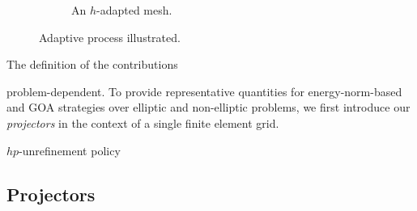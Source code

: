 \begin{figure}
\begin{subfigure}[b]{0.3\textwidth}
\begin{tikzpicture}[x=0.5cm,y=0.5cm]
    \end{tikzpicture}
    \caption{An $h$-adapted mesh.}
    \label{fig:adaptedmesh}
  \end{subfigure}
  \caption{Adaptive process illustrated.}
  \label{fig:unrefinement}
\end{figure}

The definition of the contributions { problem-dependent. To provide representative quantities for energy-norm-based and GOA strategies over elliptic and non-elliptic problems, we first introduce our \emph{projectors} in the context of a single finite element grid.

\begin{algorithm}
  \SetAlgoLined

  \caption{$hp$-unrefinement policy}
  \label{alg:unrefining}
\end{algorithm}



\subsection{Projectors}

}
